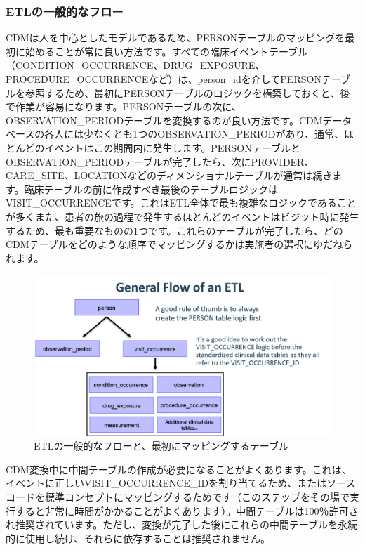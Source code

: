 \documentclass[
  11pt]{book}
\theoremstyle{definition}
\theoremstyle{definition}
\theoremstyle{definition}
\theoremstyle{definition}
\theoremstyle{remark}
\begin{document}
\subsubsection*{ETLの一般的なフロー}\label{etlux306eux4e00ux822cux7684ux306aux30d5ux30edux30fc}

CDMは人を中心としたモデルであるため、PERSONテーブルのマッピングを最初に始めることが常に良い方法です。すべての臨床イベントテーブル（CONDITION\_OCCURRENCE、DRUG\_EXPOSURE、PROCEDURE\_OCCURRENCEなど）は、person\_idを介してPERSONテーブルを参照するため、最初にPERSONテーブルのロジックを構築しておくと、後で作業が容易になります。PERSONテーブルの次に、OBSERVATION\_PERIODテーブルを変換するのが良い方法です。CDMデータベースの各人には少なくとも1つのOBSERVATION\_PERIODがあり、通常、ほとんどのイベントはこの期間内に発生します。PERSONテーブルとOBSERVATION\_PERIODテーブルが完了したら、次にPROVIDER、CARE\_SITE、LOCATIONなどのディメンショナルテーブルが通常は続きます。臨床テーブルの前に作成すべき最後のテーブルロジックはVISIT\_OCCURRENCEです。これはETL全体で最も複雑なロジックであることが多くまた、患者の旅の過程で発生するほとんどのイベントはビジット時に発生するため、最も重要なものの1つです。これらのテーブルが完了したら、どのCDMテーブルをどのような順序でマッピングするかは実施者の選択にゆだねられます。

\begin{figure}

{\centering \includegraphics[width=1\linewidth]{images/ExtractTransformLoad/flowOfEtl} 

}

\caption{ETLの一般的なフローと、最初にマッピングするテーブル}\label{fig:etlFlow}
\end{figure}

CDM変換中に中間テーブルの作成が必要になることがよくあります。これは、イベントに正しいVISIT\_OCCURRENCE\_IDを割り当てるため、またはソースコードを標準コンセプトにマッピングするためです（このステップをその場で実行すると非常に時間がかかることがよくあります）。中間テーブルは100％許可され推奨されています。ただし、変換が完了した後にこれらの中間テーブルを永続的に使用し続け、それらに依存することは推奨されません。
\end{document}
